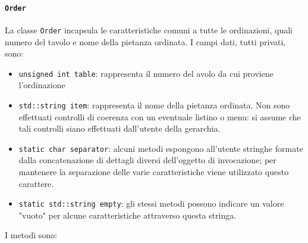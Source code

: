 \documentclass{article}
\newcommand{\code}[1]{\texttt{#1}}
\begin{document}
\paragraph{\code{Order}} %
\label{par:order}
La classe \code{Order} incapsula le caratteristiche comuni a tutte le ordinazioni, quali numero del tavolo e nome della pietanza ordinata. I campi dati, tutti privati, sono:
\begin{itemize}
	\item \code{unsigned int table}: rappresenta il numero del avolo da cui proviene l'ordinazione
	\item \code{std::string item}: rappresenta il nome della pietanza ordinata. Non sono effettuati controlli di coerenza con un eventuale listino o menu: si assume che tali controlli siano effettuati dall'utente della gerarchia.
	\item \code{static char separator}: alcuni metodi espongono all'utente stringhe formate dalla concatenazione di dettagli diversi dell'oggetto di invocazione; per mantenere la separazione delle varie caratteristiche viene utilizzato questo carattere.
	\item \code{static std::string empty}: gli stessi metodi possono indicare un valore "vuoto" per alcune caratteristiche attraverso questa stringa.
\end{itemize}
I metodi sono:
\end{document}
